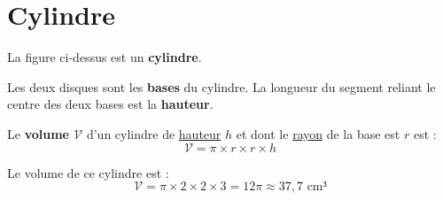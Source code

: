 \documentclass[../€Cours-complet/Cours-complet]{subfiles}
\begin{document}
\section{Cylindre}

\begin{cours}
	\begin{center}
	\end{center}

	La figure ci-dessus est un \textbf{cylindre}.

	Les deux disques sont les {\color{blue}\textbf{bases}} du cylindre. La longueur du segment reliant le centre des deux bases est la {\color{red}\textbf{hauteur}}.
\end{cours}

\begin{cours}
	Le \textbf{volume $𝒱$} d'un cylindre de \uline{hauteur} $h$ et dont le \uline{rayon} de la base est $r$ est :
	$$ 𝒱 = π × r × r × h $$
\end{cours}

\begin{exemple}
	\begin{center}
	\end{center}

	Le volume de ce cylindre est :
	$$ 𝒱 = π × 2 × 2 × 3 = 12π ≈ 37,7\text{ cm³} $$
\end{exemple}
\end{document}
